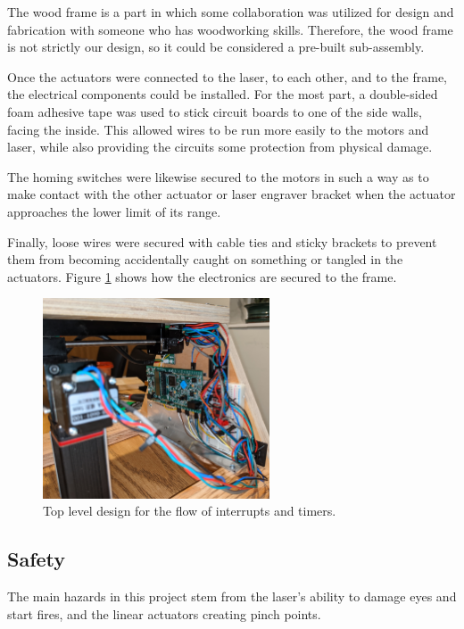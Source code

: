 \documentclass[11pt]{LaTeX-Classes/math-hw}
\begin{document}
The wood frame is a part in which some collaboration
was utilized for design and fabrication
with someone who has woodworking skills.
Therefore, the wood frame is not strictly our design,
so it could be considered a pre-built sub-assembly.

Once the actuators were connected to the laser, to each other, and to the frame,
the electrical components could be installed.
For the most part, a double-sided foam adhesive tape was used to stick circuit boards
to one of the side walls, facing the inside.
This allowed wires to be run more easily to the motors and laser, while also
providing the circuits some protection from physical damage.

The homing switches were likewise secured to the motors in such a way as to
make contact with the other actuator or laser engraver bracket when the actuator
approaches the lower limit of its range.

Finally, loose wires were secured with cable ties and sticky brackets
to prevent them from becoming accidentally caught on something or tangled in the actuators.
Figure \ref{fig:circuits-mechanical} shows how the electronics are secured to the frame.

\begin{figure}[H]
  \begin{center}
    \includegraphics[width=0.6\textwidth]{wiring-mechanical}
    \caption{Top level design for the flow of interrupts and timers.}
    \label{fig:circuits-mechanical}
  \end{center}
\end{figure}

\subsection{Safety}
The main hazards in this project stem from the laser's ability to damage eyes and start fires,
and the linear actuators creating pinch points.
\end{document}
